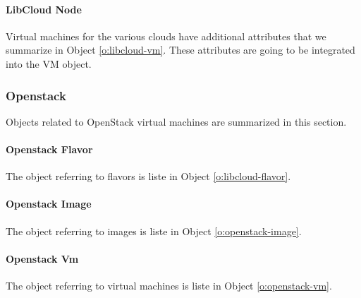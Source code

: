\documentclass[10pt]{article}
\begin{document}

\paragraph{LibCloud Node}\label{S:libcloudnode}

Virtual machines for the various clouds have additional attributes
that we summarize in Object \ref{o:libcloud-vm}.  These attributes are
going to be integrated into the VM object.



\subsubsection{Openstack}\label{S:openstack}

Objects related to OpenStack virtual machines are summarized in this
section.

\paragraph{Openstack Flavor}

The object referring to flavors is liste in Object
\ref{o:libcloud-flavor}.


\paragraph{Openstack Image}

The object referring to images is liste in Object
\ref{o:openstack-image}.


\paragraph{Openstack Vm}

The object referring to virtual machines is liste in Object \ref{o:openstack-vm}.



\end{document}

